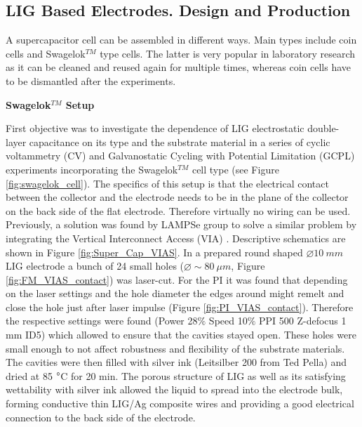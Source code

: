 \subsection{LIG Based Electrodes. Design and Production}

A supercapacitor cell can be assembled in different ways. Main types include coin cells and Swagelok$^{TM}$ type cells. The latter is very popular in laboratory research as it can be cleaned and reused again for multiple times, whereas coin cells have to be dismantled after the experiments.  

\medskip
\textbf{Swagelok$^{TM}$ Setup}

First objective was to investigate the dependence of LIG electrostatic double-layer capacitance on its type and the substrate material in a series of cyclic voltammetry (CV) and Galvanostatic Cycling with Potential Limitation (GCPL) experiments incorporating the Swagelok$^{TM}$ cell type (see Figure \ref{fig:swagelok_cell}). The specifics of this setup is that the electrical contact between the collector and the electrode needs to be in the plane of the collector on the back side of the flat electrode. Therefore virtually no wiring can be used. Previously, a solution was found by LAMPSe group to solve a similar problem by integrating the Vertical Interconnect Access (VIA) \cite{dallinger_stretchable_2020}. Descriptive schematics are shown in Figure \ref{fig:Super_Cap_VIAS}. In a prepared round shaped $\varnothing 10\:mm$ LIG electrode a bunch of 24 small holes ($\varnothing \sim 80\:\mu m$, Figure \ref{fig:FM_VIAS_contact}) was laser-cut. For the PI it was found that depending on the laser settings and the hole diameter the edges around might remelt and close the hole just after laser impulse (Figure \ref{fig:PI_VIAS_contact}). Therefore the respective settings were found (Power 28$\%$ Speed 10$\%$ PPI 500 Z-defocus 1 mm ID5) which allowed to ensure that the cavities stayed open. These holes were small enough to not affect robustness and flexibility of the substrate materials. The cavities were then filled with silver ink (Leitsilber 200 from Ted Pella) and dried at 85 $\degree$C for 20 min. The porous structure of LIG as well as its satisfying wettability with silver ink allowed the liquid to spread into the electrode bulk, forming conductive thin LIG/Ag composite wires and providing a good electrical connection to the back side of the electrode. 

